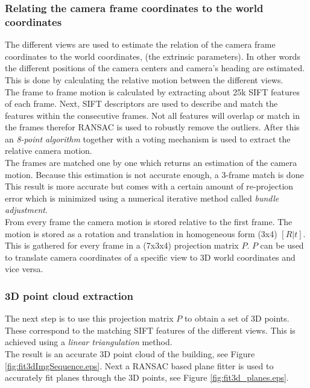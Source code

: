 \subsubsection{Relating the camera frame coordinates to the world coordinates}
The different views are used to estimate the relation of the camera frame
coordinates to the world coordinates, (the extrinsic parameters).  In other
words the different positions of the camera centers and camera's heading are
estimated.  This is done by calculating the relative motion between the
different views.\\

The frame to frame motion is calculated by extracting about 25k SIFT features of
each frame.  Next, SIFT descriptors are used to describe and match the features
within the consecutive frames.  Not all features will overlap or match in the
frames therefor RANSAC is used to robustly remove the outliers.  After this an
\emph{8-point algorithm} together with a voting mechanism is used to extract the
relative camera motion.\\

The frames are matched one by one which returns an estimation of the camera
motion. Because this estimation is not accurate enough, a 3-frame match is done 
This result is more accurate but comes with a certain
amount of re-projection error which is minimized using a numerical
iterative method called \emph{bundle adjustment}.  \\

From every frame the camera motion is stored relative to the first frame.
The motion is stored as a rotation and translation in homogeneous
form (3x4) $[R|t]$. This is gathered for every frame in a (7x3x4) projection matrix $P$.
$P$ can be used to translate camera coordinates of a specific view 
 to 3D world coordinates and vice versa.

\subsubsection{3D point cloud extraction}
The next step is to use this projection matrix $P$ to obtain a set of 3D points.
These correspond to the matching SIFT features of the different views.  This
is achieved using a \emph{linear triangulation} method. \\
The result is an accurate 3D point cloud of the building, see Figure
\ref{fig:fit3dImgSequence.eps}.
Next a RANSAC based plane fitter is used to accurately fit planes through
the 3D points, see Figure \ref{fig:fit3d_planes.eps}.\\

